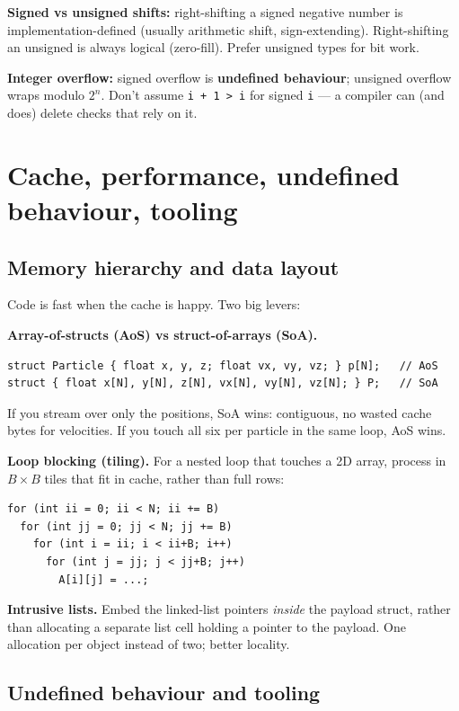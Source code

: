 \documentclass[11pt,a4paper]{article}
\begin{document}
\textbf{Signed vs unsigned shifts:} right-shifting a signed negative number is implementation-defined (usually arithmetic shift, sign-extending). Right-shifting an unsigned is always logical (zero-fill). Prefer unsigned types for bit work.

\textbf{Integer overflow:} signed overflow is \textbf{undefined behaviour}; unsigned overflow wraps modulo $2^n$. Don't assume \verb|i + 1 > i| for signed \verb|i| --- a compiler can (and does) delete checks that rely on it.

\hrulefill

\section{Cache, performance, undefined behaviour, tooling}

\subsection{Memory hierarchy and data layout}

Code is fast when the cache is happy. Two big levers:

\textbf{Array-of-structs (AoS) vs struct-of-arrays (SoA).}
\begin{lstlisting}
struct Particle { float x, y, z; float vx, vy, vz; } p[N];   // AoS
struct { float x[N], y[N], z[N], vx[N], vy[N], vz[N]; } P;   // SoA
\end{lstlisting}
If you stream over only the positions, SoA wins: contiguous, no wasted cache bytes for velocities. If you touch all six per particle in the same loop, AoS wins.

\textbf{Loop blocking (tiling).} For a nested loop that touches a 2D array, process in $B \times B$ tiles that fit in cache, rather than full rows:
\begin{lstlisting}
for (int ii = 0; ii < N; ii += B)
  for (int jj = 0; jj < N; jj += B)
    for (int i = ii; i < ii+B; i++)
      for (int j = jj; j < jj+B; j++)
        A[i][j] = ...;
\end{lstlisting}

\textbf{Intrusive lists.} Embed the linked-list pointers \emph{inside} the payload struct, rather than allocating a separate list cell holding a pointer to the payload. One allocation per object instead of two; better locality.

\subsection{Undefined behaviour and tooling}
\end{document}
